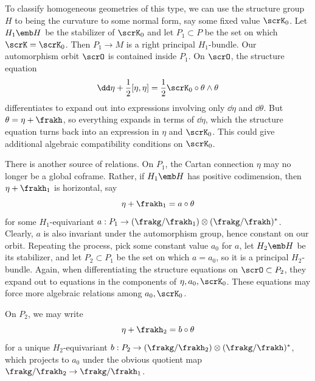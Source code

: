 To classify homogeneous geometries of this type, we can use the structure group $H$ to being the curvature to some normal form, say some fixed value $\scrK_0$. Let $H_1\emb H$ be the stabilizer of $\scrK_0$ and let $P_1\subset P$ be the set on which $\scrK=\scrK_0$. Then $P_1\to M$ is a right principal $H_1$-bundle. Our automorphism orbit $\scrO$ is contained inside $P_1$. On $\scrO$, the structure equation 
\[\dd\eta+\frac12[\eta,\eta]=\frac12\scrK_0\circ \theta\wedge\theta\label{eq 12469}\]
differentiates to expand out into expressions involving only $\dd\eta$ and $\dd\theta$. But $\theta=\eta+\frakh$, so everything expands in terms of $\dd\eta$, which the structure equation turns back into an expression in $\eta$ and $\scrK_0$. This could give additional algebraic compatibility conditions on $\scrK_0$.

There is another source of relations. On $P_1$, the Cartan connection $\eta$ may no longer be a global coframe. Rather, if $H_1\emb H$ has positive codimension, then $\eta+\frakh_1$ is horizontal, say 
\[\eta+\frakh_1=a\circ\theta\]
for some $H_1$-equivariant $a:P_1\to (\frakg\slash\frakh_1)\otimes(\frakg\slash\frakh)^\ast$. Clearly, $a$ is also invariant under the automorphism group, hence constant on our orbit. Repeating the process, pick some constant value $a_0$ for $a$, let $H_2\emb H$ be its stabilizer, and let $P_2\subset P_1$ be the set on which $a=a_0$, so it is a principal $H_2$-bundle. Again, when differentiating the structure equations on $\scrO\subset P_2$, they expand out to equations in the components of $\eta,a_0,\scrK_0$. These equations may force more algebraic relations among $a_0,\scrK_0$.

On $P_2$, we may write 
\[\eta+\frakh_2=b\circ \theta\]
for a unique $H_2$-equivariant $b:P_2\to (\frakg\slash\frakh_2)\otimes(\frakg\slash\frakh)^\ast$, which projects to $a_0$ under the obvious quotient map $\frakg\slash\frakh_2\to\frakg\slash\frakh_1$.

